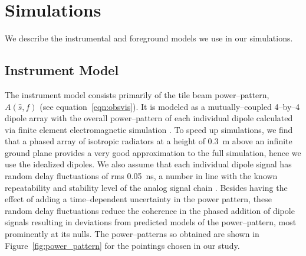 \documentclass[preprint2,iop,numberedappendix]{emulateapj}
\begin{document}
\section{Simulations}\label{sec:modeling}

We describe the instrumental and foreground models we use in our simulations. 

\subsection{Instrument Model}\label{sec:instrument_model}

The instrument model consists primarily of the tile beam power--pattern, $A(\hat{s},f)$ (see equation~\ref{eqn:obsvis}). It is modeled as a mutually--coupled 4--by--4 dipole array with the overall power--pattern of each individual dipole calculated via finite element electromagnetic simulation \citep{sut14}. To speed up simulations, we find that a phased array of isotropic radiators at a height of 0.3~m above an infinite ground plane provides a very good approximation to the full simulation, hence we use the idealized dipoles. We also assume that each individual dipole signal has random delay fluctuations of rms 0.05~ns, a number in line with the known repeatability and stability level of the analog signal chain \citep{bow07b}. Besides having the effect of adding a time--dependent uncertainty in the power pattern, these random delay fluctuations reduce the coherence in the phased addition of dipole signals resulting in deviations from predicted models of the power--pattern, most prominently at its nulls. The power--patterns so obtained are shown in Figure~\ref{fig:power_pattern} for the pointings chosen in our study.
\end{document}
